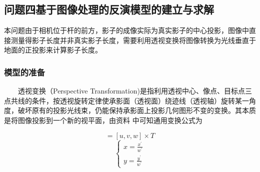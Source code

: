 \documentclass[12pt]{cumcmart}   %
\begin{document}
\subsection{问题四基于图像处理的反演模型的建立与求解}
本问题由于相机位于杆的前方，影子的成像实际为真实影子的中心投影，图像中直接测量得影子长度并非真实影子长度，需要利用透视变换将图像转换为光线垂直于地面的正投影来计算影子长度。
\subsubsection{模型的准备}
$\qquad$透视变换（Perspective Transformation)是指利用透视中心、像点、目标点三点共线的条件，按透视旋转定律使承影面（透视面）绕迹线（透视轴）旋转某一角度，破坏原有的投影光线束，仍能保持承影面上投影几何图形不变的变换。其本质是将图像投影到一个新的视平面，由资料 中可知通用变换公式为

\begin{equation}
[x^{'},y^{'},w^{'}]=[u,v,w]\times T
\end{equation}
\begin{equation}
\left\{ \begin{array}{l}
x = \frac{{x^{'}}}{{w^{'}}}\\
y = \frac{{y^{'}}}{{w^{'}}}
\end{array} \right.
\end{equation}
\end{document}
